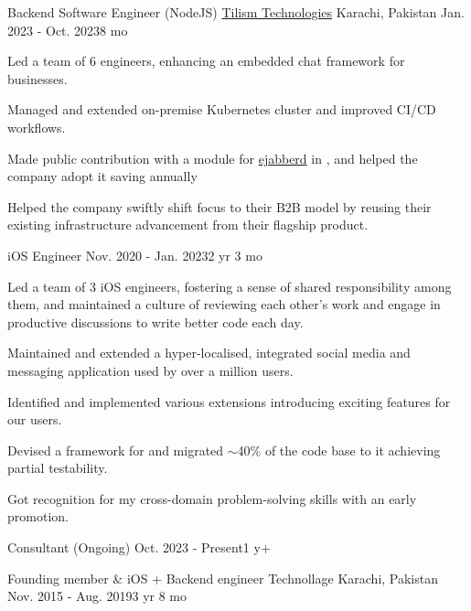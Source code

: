 \begin{cventries}
  \cventry
  {Backend Software Engineer (NodeJS)} %
  {\href{https://www.tilismtech.com/}{Tilism Technologies}} %
  {Karachi, Pakistan} %
  {Jan. 2023 - Oct. 2023{\enskip\cdotp\enskip}8 mo} %
  {
    \begin{cvitems} %
      \item {Led a team of 6 engineers, enhancing an embedded chat framework for businesses.}
      \item {Managed and extended on-premise Kubernetes cluster and improved CI/CD workflows.}
      \item {Made public contribution with a module for \href{https://github.com/processone/ejabberd-contrib/pull/311}{\textcolor{awesome}{ejabberd}} in , and helped the company adopt it saving  annually}
      \item {Helped the company swiftly shift focus to their B2B model by reusing their existing infrastructure advancement from their flagship product.}
    \end{cvitems}
  }

  \cventry
  {iOS Engineer} %
  {} %
  {} %
  {Nov. 2020 - Jan. 2023{\enskip\cdotp\enskip}2 yr 3 mo} %
  {
    \begin{cvitems} %
      \item {Led a team of 3 iOS engineers, fostering a sense of shared responsibility among them, and maintained a culture of reviewing each other's work and engage in productive discussions to write better code each day.}
      \item {Maintained and extended a hyper-localised, integrated social media and messaging application used by over a million users.}
      \item {Identified and implemented various  extensions introducing exciting features for our users.}
      \item {Devised a framework for  and migrated $\sim$40\% of the code base to it achieving partial testability.}
      \item {Got recognition for my cross-domain problem-solving skills with an early promotion.}
    \end{cvitems}
  }

  \cventry
  {Consultant (Ongoing)} %
  {}
  {}
  {Oct. 2023 - Present{\enskip\cdotp\enskip}1 y+} %
  {
  }

  \cventry
  {Founding member \& iOS + Backend engineer} %
  {Technollage} %
  {Karachi, Pakistan} %
  {Nov. 2015 - Aug. 2019{\enskip\cdotp\enskip}3 yr 8 mo} %
  {
  }

\end{cventries}
